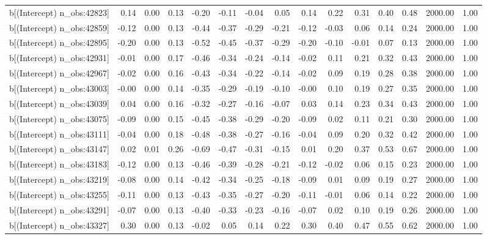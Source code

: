 \begin{table}[ht]
\begin{tabular}{rrrrrrrrrrrrrrr}
  b[(Intercept) n\_obs:42823] & 0.14 & 0.00 & 0.13 & -0.20 & -0.11 & -0.04 & 0.05 & 0.14 & 0.22 & 0.31 & 0.40 & 0.48 & 2000.00 & 1.00 \\ 
  b[(Intercept) n\_obs:42859] & -0.12 & 0.00 & 0.13 & -0.44 & -0.37 & -0.29 & -0.21 & -0.12 & -0.03 & 0.06 & 0.14 & 0.24 & 2000.00 & 1.00 \\ 
  b[(Intercept) n\_obs:42895] & -0.20 & 0.00 & 0.13 & -0.52 & -0.45 & -0.37 & -0.29 & -0.20 & -0.10 & -0.01 & 0.07 & 0.13 & 2000.00 & 1.00 \\ 
  b[(Intercept) n\_obs:42931] & -0.01 & 0.00 & 0.17 & -0.46 & -0.34 & -0.24 & -0.14 & -0.02 & 0.11 & 0.21 & 0.32 & 0.43 & 2000.00 & 1.00 \\ 
  b[(Intercept) n\_obs:42967] & -0.02 & 0.00 & 0.16 & -0.43 & -0.34 & -0.22 & -0.14 & -0.02 & 0.09 & 0.19 & 0.28 & 0.38 & 2000.00 & 1.00 \\ 
  b[(Intercept) n\_obs:43003] & -0.00 & 0.00 & 0.14 & -0.35 & -0.29 & -0.19 & -0.10 & -0.00 & 0.10 & 0.19 & 0.27 & 0.35 & 2000.00 & 1.00 \\ 
  b[(Intercept) n\_obs:43039] & 0.04 & 0.00 & 0.16 & -0.32 & -0.27 & -0.16 & -0.07 & 0.03 & 0.14 & 0.23 & 0.34 & 0.43 & 2000.00 & 1.00 \\ 
  b[(Intercept) n\_obs:43075] & -0.09 & 0.00 & 0.15 & -0.45 & -0.38 & -0.29 & -0.20 & -0.09 & 0.02 & 0.11 & 0.21 & 0.30 & 2000.00 & 1.00 \\ 
  b[(Intercept) n\_obs:43111] & -0.04 & 0.00 & 0.18 & -0.48 & -0.38 & -0.27 & -0.16 & -0.04 & 0.09 & 0.20 & 0.32 & 0.42 & 2000.00 & 1.00 \\ 
  b[(Intercept) n\_obs:43147] & 0.02 & 0.01 & 0.26 & -0.69 & -0.47 & -0.31 & -0.15 & 0.01 & 0.20 & 0.37 & 0.53 & 0.67 & 2000.00 & 1.00 \\ 
  b[(Intercept) n\_obs:43183] & -0.12 & 0.00 & 0.13 & -0.46 & -0.39 & -0.28 & -0.21 & -0.12 & -0.02 & 0.06 & 0.15 & 0.23 & 2000.00 & 1.00 \\ 
  b[(Intercept) n\_obs:43219] & -0.08 & 0.00 & 0.14 & -0.42 & -0.34 & -0.25 & -0.18 & -0.09 & 0.01 & 0.09 & 0.19 & 0.27 & 2000.00 & 1.00 \\ 
  b[(Intercept) n\_obs:43255] & -0.11 & 0.00 & 0.13 & -0.43 & -0.35 & -0.27 & -0.20 & -0.11 & -0.01 & 0.06 & 0.14 & 0.22 & 2000.00 & 1.00 \\ 
  b[(Intercept) n\_obs:43291] & -0.07 & 0.00 & 0.13 & -0.40 & -0.33 & -0.23 & -0.16 & -0.07 & 0.02 & 0.10 & 0.19 & 0.26 & 2000.00 & 1.00 \\ 
  b[(Intercept) n\_obs:43327] & 0.30 & 0.00 & 0.13 & -0.02 & 0.05 & 0.14 & 0.22 & 0.30 & 0.40 & 0.47 & 0.55 & 0.62 & 2000.00 & 1.00 \\ 

\end{tabular}
\end{table}

